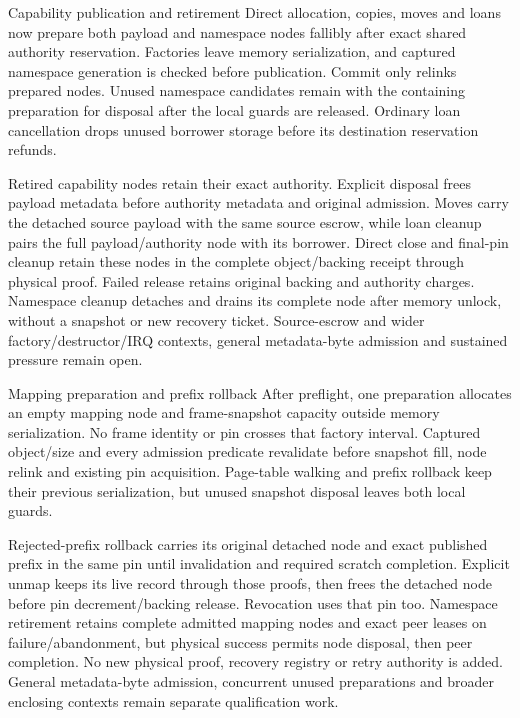 \begin{implementationdetail}{Capability publication and retirement}
Direct allocation, copies, moves and loans now prepare both payload and namespace
nodes fallibly after exact shared authority reservation. Factories leave memory
serialization, and captured namespace generation is checked before publication.
Commit only relinks prepared nodes. Unused namespace candidates remain with the
containing preparation for disposal after the local guards are released.
Ordinary loan cancellation drops unused borrower storage before its destination
reservation refunds.

Retired capability nodes retain their exact authority. Explicit disposal frees
payload metadata before authority metadata and original admission. Moves carry
the detached source payload with the same source escrow, while loan cleanup pairs the
full payload/authority node with its borrower. Direct close and final-pin cleanup
retain these nodes in the complete object/backing receipt through physical proof.
Failed release retains original backing and authority charges. Namespace cleanup
detaches and drains its complete node after memory unlock, without a snapshot or
new recovery ticket. Source-escrow and wider factory/destructor/IRQ contexts,
general metadata-byte admission and sustained pressure remain open.
\end{implementationdetail}

\begin{implementationdetail}{Mapping preparation and prefix rollback}
After preflight, one preparation allocates an empty mapping node and frame-snapshot
capacity outside memory serialization. No frame identity or pin crosses that
factory interval. Captured object/size and every admission predicate revalidate
before snapshot fill, node relink and existing pin acquisition. Page-table walking
and prefix rollback keep their previous serialization, but unused snapshot disposal
leaves both local guards.

Rejected-prefix rollback carries its original detached node and exact published
prefix in the same pin until invalidation and required scratch completion.
Explicit unmap keeps its live record through those proofs, then frees the detached
node before pin decrement/backing release. Revocation uses that pin too. Namespace
retirement retains complete admitted mapping nodes and exact peer leases on
failure/abandonment, but physical success permits node disposal, then peer completion.
No new physical proof, recovery registry or retry authority is added. General
metadata-byte admission, concurrent unused preparations and broader enclosing
contexts remain separate qualification work.
\end{implementationdetail}

